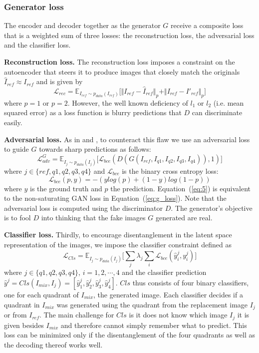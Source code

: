 \documentclass[12pt,a4paper]{article}
\begin{document}
\subsubsection{Generator loss}
The encoder and decoder together as the generator $G$ receive a composite loss that is a weighted sum of three losses: the reconstruction loss, the adversarial loss and the classifier loss. 

\textbf{Reconstruction loss.} The reconstruction loss imposes a constraint on the autoencoder that steers it to produce images that closely match the originals $\hat{I}_{ref} \approx I_{ref}$ and is given by
\begin{equation} \label{eq:4}
    \mathcal{L}_{rec} = \mathbb{E}_{I_{ref}\sim p_{data} (I_{ref})}\big[ \Vert I_{ref} - \hat{I}_{ref} \Vert_p + \Vert I_{ref} - I'_{ref} \Vert_p \big]
\end{equation}
where $p = 1$ or $p = 2$. However, the well known deficiency of $l_1$ or $l_2$ (i.e. mean squared error) as a loss function is blurry predictions that $D$ can discriminate easily. 

\textbf{Adversarial loss.} As in \cite{DisentFacOfVarByMixTh} and \cite{1511.05440}, to counteract this flaw we use an adversarial loss to guide $G$ towards sharp predictions as follows:
\begin{equation} \label{eq:5}
    \mathcal{L}^G_{adv} = \mathbb{E}_{I_{j}\sim p_{data} (I_{j})}\big[ \mathcal{L}_{bce}(D(G(I_{ref},I_{q1},I_{q2},I_{q3},I_{q4})), 1)\big]
\end{equation}
where $j \in \{ref,q1,q2,q3,q4\}$ and $\mathcal{L}_{bce}$ is the binary cross entropy loss:
\begin{equation} \label{eq:6}
    \mathcal{L}_{bce}(p, y) = -(ylog(p) + (1 - y)log(1-p))
\end{equation}
where $y$ is the ground truth and $p$ the prediction. Equation~(\ref{eq:5}) is equivalent to the non-saturating GAN loss in Equation~(\ref{eq:g_loss}). Note that the adversarial loss is computed using the discriminator $D$. The generator's objective is to fool $D$ into thinking that the fake images $G$ generated are real.

\textbf{Classifier loss.} Thirdly, to encourage disentanglement in the latent space representation of the images, we impose the classifier constraint defined as
\begin{equation} \label{eq:cls}
    \mathcal{L}_{Cls} = \mathbb{E}_{I_{j}\sim p_{data} (I_{j})}\big[\sum_{j} \lambda_j \sum_{i} \mathcal{L}_{bce}(\hat{y}^j_i, y^j_i)\big]
\end{equation}
where $j \in \{q1,q2,q3,q4\}$, $i=1,2,\cdots,4$ and the classifier prediction $\hat{y}^j = Cls(I_{mix}, I_j) = [\hat{y}^j_1, \hat{y}^j_2, \hat{y}^j_3, \hat{y}^j_4]$. $Cls$ thus consists of four binary classifiers, one for each quadrant of $I_{mix}$, the generated image. Each classifier decides if a quadrant in $I_{mix}$ was generated using the quadrant from the replacement image $I_j$ or from $I_{ref}$. The main challenge for $Cls$ is it does not know which image $I_j$ it is given besides $I_{mix}$ and therefore cannot simply remember what to predict. This loss can be minimized only if the disentanglement of the four quadrants as well as the decoding thereof works well.
\end{document}
